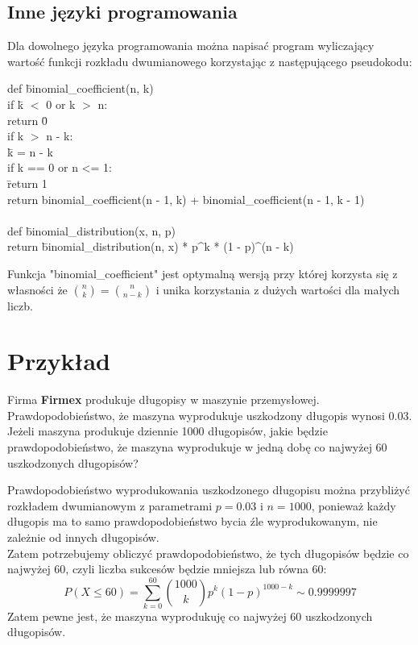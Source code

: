 \documentclass{article}
\begin{document}
\subsection{Inne języki programowania}
Dla dowolnego języka programowania można napisać program wyliczający wartość funkcji rozkładu dwumianowego korzystając z następującego pseudokodu:
{\selectfont \begin{tabbing}
def \= binomial\_coefficient(n, k) \+ \\
    if \= k $<$ 0 or k $>$ n: \\
    \>    return \= 0 \\
    if k $>$ n - k: \\
     \> \=   k = n - k \\
    if k == 0 or n <= 1: \\
        \> \=return 1 \\
    return binomial\_coefficient(n - 1, k) + binomial\_coefficient(n - 1, k - 1)  \- \\
\\
def \= binomial\_distribution(x, n, p) \+ \\
return \= binomial\_distribution(n, x) * p\textasciicircum k * (1 - p)\textasciicircum (n - k)
\end{tabbing}
}
Funkcja "binomial\_coefficient" jest optymalną wersją przy której korzysta się z własności że $\binom{n}{k} = \binom{n}{n-k}$ i unika korzystania z dużych wartości dla małych liczb.

\section{Przykład}
Firma \textbf{Firmex} produkuje długopisy w maszynie przemysłowej. Prawdopodobieństwo, że maszyna wyprodukuje uszkodzony długopis wynosi 0.03. Jeżeli maszyna produkuje dziennie 1000 długopisów, jakie będzie prawdopodobieństwo, że maszyna wyprodukuje w jedną dobę co najwyżej 60 uszkodzonych długopisów? \par
Prawdopodobieństwo wyprodukowania uszkodzonego długopisu można przybliżyć rozkładem dwumianowym z parametrami $p = 0.03$ i $n = 1000$, ponieważ każdy długopis ma to samo prawdopodobieństwo bycia źle wyprodukowanym, nie zależnie od innych długopisów. \\
Zatem potrzebujemy obliczyć prawdopodobieństwo, że tych długopisów będzie co najwyżej 60, czyli liczba sukcesów będzie mniejsza lub równa 60:
$$P(X\leq60)=\sum_{k=0}^{60}\binom{1000}{k}p^k(1-p)^{1000-k}\sim0.9999997$$
Zatem pewne jest, że maszyna wyprodukuję co najwyżej 60 uszkodzonych długopisów.
\end{document}
